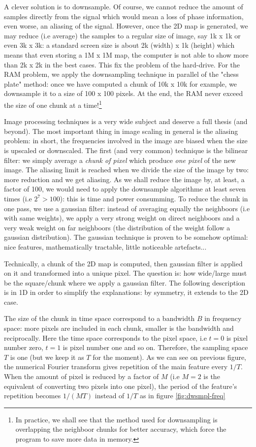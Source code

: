 \documentclass[11pt]{report}
\begin{document}
A clever solution is to downsample. Of course, we cannot reduce the amount of samples directly from the signal which would mean a loss of phase information, even worse, an aliasing of the signal. However, once the 2D map is generated, we may reduce (i.e average) the samples to a regular size of image, say 1k x 1k or even 3k x 3k: a standard screen size is about 2k (width) x 1k (height) which means that even storing a 1M x 1M map, the computer is not able to show more than 2k x 2k in the best cases. This fix the problem of the hard-drive. For the RAM problem, we apply the downsampling technique in parallel of the "chess plate" method: once we have computed a chunk of 10k x 10k for example, we downsample it to a size of 100 x 100 pixels. At the end, the RAM never exceed the size of one chunk at a time!\footnote{In practice, we shall see that the method used for downsampling is overlapping the neighboor chunks for better accuracy, which force the program to save more data in memory.}

Image processing techniques is a very wide subject and deserve a full thesis (and beyond). The most important thing in image scaling in general is the aliasing problem: in short, the frequencies involved in the image are biased when the size is upscaled or downscaled. The first (and very common) technique is the bilinear filter: we simply average a \textit{chunk of pixel} which produce \textit{one pixel} of the new image. The aliasing limit is reached when we divide the size of the image by two: more reduction and we get aliasing. As we shall reduce the image by, at least, a factor of 100, we would need to apply the downsample algorithme at least seven times (i.e $2^7 > 100$): this is time and power consumming. To reduce the chunk in one pass, we use a gaussian filter: instead of averaging equally the neighboors (i.e with same weights), we apply a very strong weight on direct neighboors and a very weak weight on far neighboors (the distribution of the weight follow a gaussian distribution). The gaussian technique is proven to be somehow optimal: nice features, mathematically tractable, little noticeable artefacts...

Technically, a chunk of the 2D map is computed, then gaussian filter is applied on it and transformed into a unique pixel. The question is: how wide/large must be the square/chunk where we apply a gaussian filter. The following description is in 1D in order to simplify the explanations: by symmetry, it extends to the 2D case.

The size of the chunk in time space correspond to a bandwidth $B$ in frequency space: more pixels are included in each chunk, smaller is the bandwidth and reciprocally. Here the time space corresponds to the pixel space, i.e $t=0$ is pixel number zero, $t=1$ is pixel number one and so on. Therefore, the sampling space $T$ is one (but we keep it as $T$ for the moment). As we can see on previous figure, the numerical Fourier transform gives repetition of the main feature every $1/T$. When the amount of pixel is reduced by a factor of $M$ (i.e $M=2$ is the equivalent of converting two pixels into one pixel), the period of the feature's repetition becomes $1/(MT)$ instead of $1/T$ as in figure \ref{fig:dwsmpl-freq}
\end{document}
